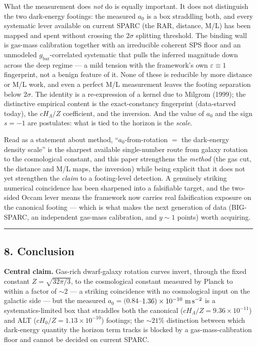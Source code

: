 \documentclass[
]{article}
\begin{document}
What the measurement does \emph{not} do is equally important. It does
not distinguish the two dark-energy footings: the measured \(a_0\) is a
box straddling both, and every systematic lever available on current
SPARC (the RAR, distance, M/L) has been mapped and spent without
crossing the \(2\sigma\) splitting threshold. The binding wall is
gas-mass calibration together with an irreducible coherent SPS floor and
an unmodeled \(g_\mathrm{bar}\)-correlated systematic that pulls the
inferred magnitude down across the deep regime --- a mild tension with
the framework's own \(\varepsilon\equiv1\) fingerprint, not a benign
feature of it. None of these is reducible by more distance or M/L work,
and even a perfect M/L measurement leaves the footing separation below
\(2\sigma\). The identity is a re-expression of a kernel due to Milgrom
(1999); the distinctive empirical content is the exact-constancy
fingerprint (data-starved today), the \(cH_\Lambda/Z\) coefficient, and
the inversion. And the value of \(a_0\) and the sign \(s=-1\) are
postulates: what is tied to the horizon is the \emph{scale}.

Read as a statement about method, ``\(a_0\)-from-rotation \(=\) the
dark-energy density scale'' is the sharpest available single-number
route from galaxy rotation to the cosmological constant, and this paper
strengthens the \emph{method} (the gas cut, the distance and M/L maps,
the inversion) while being explicit that it does not yet strengthen the
\emph{claim} to a footing-level detection. A genuinely striking
numerical coincidence has been sharpened into a falsifiable target, and
the two-sided Occam lever means the framework now carries real
falsification exposure on the canonical footing --- which is what makes
the next generation of data (BIG-SPARC, an independent gas-mass
calibration, and \(y\sim1\) points) worth acquiring.

\begin{center}\rule{0.5\linewidth}{0.5pt}\end{center}

\subsection{8. Conclusion}\label{conclusion}

\textbf{Central claim.} Gas-rich dwarf-galaxy rotation curves invert,
through the fixed constant \(Z=\sqrt{32\pi/3}\), to the cosmological
constant measured by Planck to within a factor of \(\sim2\) --- a
striking coincidence with no cosmological input on the galactic side ---
but the measured \(a_0=(0.84\)--\(1.36)\times10^{-10}\ {\rm m\,s^{-2}}\)
is a systematics-limited box that straddles both the canonical
(\(cH_\Lambda/Z=9.36\times10^{-11}\)) and ALT
(\(cH_0/Z=1.13\times10^{-10}\)) footings; the \(\sim21\%\) distinction
between which dark-energy quantity the horizon term tracks is blocked by
a gas-mass-calibration floor and cannot be decided on current SPARC.
\end{document}
